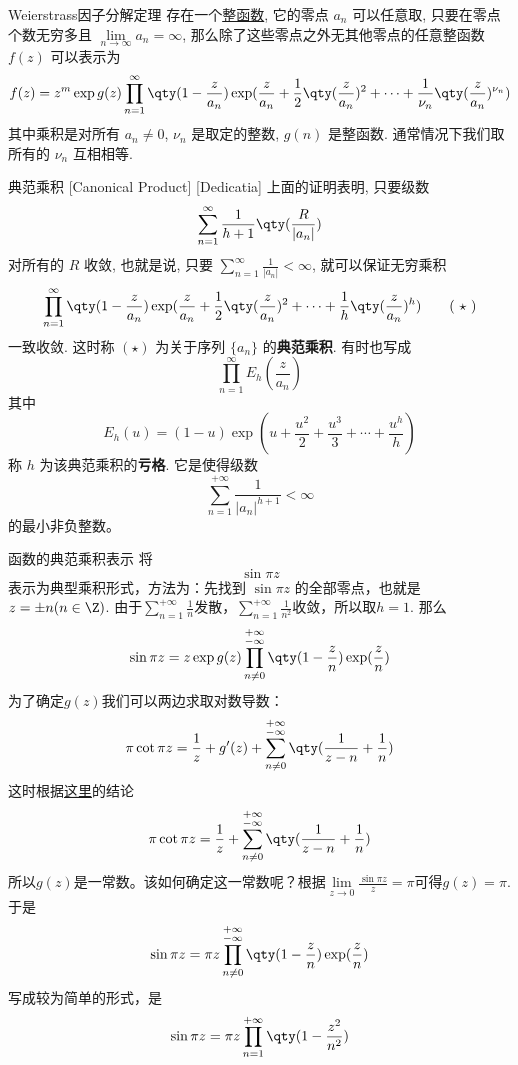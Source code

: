 \documentclass[UTF8]{ctexart}
\begin{document}
\begin{thm}
    {Weierstrass因子分解定理}
    存在一个\hyperref[dfn:EntireFunction]{整函数}, 它的零点 \( a_n \) 可以任意取, 只要在零点个数无穷多且 \( \lim\limits_{n\to\infty }a_n=\infty \), 那么除了这些零点之外无其他零点的任意整函数 \( f(z) \) 可以表示为
    \[f(z)=z^m\exp g(z)\prod_{n=1}^{\infty}\qty(1-\frac{z}{a_n})\exp(\frac{z}{a_n}+\frac{1}{2}\qty(\frac{z}{a_n})^2+\cdots+\frac{1}{\nu_n}\qty(\frac{z}{a_n})^{\nu_n})\]
    其中乘积是对所有 \( a_n\neq 0 \),  \( \nu_n \) 是取定的整数,  \( g(n) \) 是整函数. 通常情况下我们取所有的 \( \nu_n \) 互相相等. 
\end{thm}
\begin{dfn}
    [CanonicalProduct]
    {典范乘积}
    [Canonical Product]
    [Dedicatia]
    上面的证明表明, 只要级数
    \[\sum_{n=1}^{\infty}\frac{1}{h+1}\qty(\frac{R}{|a_n|})\]
    对所有的 \( R \) 收敛, 也就是说, 只要 \( \sum\limits_{n=1}^{\infty}\frac{1}{|a_n|}<\infty \), 就可以保证无穷乘积
    \[\prod_{n=1}^{\infty}\qty(1-\frac{z}{a_n})\exp(\frac{z}{a_n}+\frac{1}{2}\qty(\frac{z}{a_n})^2+\cdots+\frac{1}{h}\qty(\frac{z}{a_n})^{h})\tag{ \( \star \) }\]
    一致收敛. 这时称 \( (\star) \) 为关于序列 \( \{a_n\} \) 的\textbf{典范乘积}. 有时也写成
    \[\prod_{n=1}^{\infty}E_h(\frac{z}{a_n})\]
    其中
    \[E_h(u)=(1-u)\exp(u+\frac{u^2}{2}+\frac{u^3}{3}+\cdots+\frac{u^h}{h})\]
    称 \( h \) 为该典范乘积的\textbf{亏格}. 它是使得级数
    \[\sum_{n=1}^{+\infty}\frac{1}{|a_n|^{h+1}}<\infty\]
    的最小非负整数。
\end{dfn}
\begin{xmp}
    {函数的典范乘积表示}
    将
    \[\sin \pi z\]
    表示为典型乘积形式，方法为：先找到 \(\sin\pi z\) 的全部零点，也就是 \(z=\pm n(n\in\Z)\). 由于$\sum_{n=1}^{+\infty}\frac{1}{n}$发散，$\sum_{n=1}^{+\infty}\frac{1}{n^2}$收敛，所以取$h=1$. 那么
    \[\sin\pi z=z\exp g(z)\prod_{n\neq 0}^{\substack{+\infty\\ -\infty}}\qty(1-\frac{z}{n})\exp(\frac{z}{n})\]
    为了确定$g(z)$我们可以两边求取对数导数：
    \[\pi\cot\pi z=\frac{1}{z}+g'(z)+\sum_{n\neq 0}^{\substack{+\infty\\ -\infty}}\qty(\frac{1}{z-n}+\frac{1}{n})\]
    这时根据\hyperref[xmp:64]{这里}的结论
    \[\pi\cot\pi z=\frac{1}{z}+\sum_{n\neq 0}^{\substack{+\infty\\ -\infty}}\qty(\frac{1}{z-n}+\frac{1}{n})\]
    所以$g(z)$是一常数。该如何确定这一常数呢？根据$\lim\limits_{z\to 0}\frac{\sin\pi z}{z}=\pi$可得$g(z)=\pi$. 于是
    \[\sin\pi z=\pi z\prod_{n\neq 0}^{\substack{+\infty\\ -\infty}}\qty(1-\frac{z}{n})\exp(\frac{z}{n})\]
    写成较为简单的形式，是
    \[\sin\pi z=\pi z\prod_{n=1}^{+\infty}\qty(1-\frac{z^2}{n^2})\]
\end{xmp}
\end{document}
